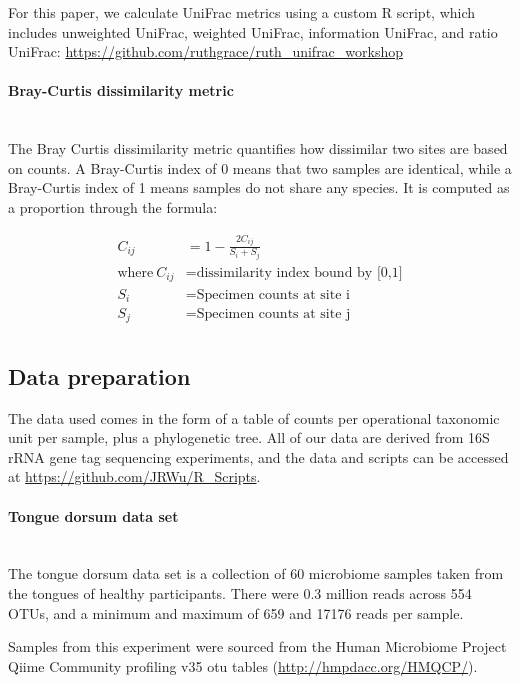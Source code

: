 \documentclass[10pt,letterpaper]{article}
\begin{document}
For this paper, we calculate UniFrac metrics using a custom R script, which includes unweighted UniFrac, weighted UniFrac, information UniFrac, and ratio UniFrac: \url{https://github.com/ruthgrace/ruth_unifrac_workshop}

\paragraph{Bray-Curtis dissimilarity metric}\mbox{}\\
The Bray Curtis dissimilarity metric \cite{beals1984bray} quantifies how dissimilar two sites are based on counts. A Bray-Curtis index of 0 means that two samples are identical, while a Bray-Curtis index of 1 means samples do not share any species. It is computed as a proportion through the formula:

\begin{align*}
C_{ij} &= 1 - \frac{2C_{ij}}{S_{i} + S_{j}} \\
\text{where}~C_{ij}&= \text{dissimilarity index bound by [0,1]} \\
  S_{i} &= \text{Specimen counts at site i} \\
  S_{j} &= \text{Specimen counts at site j} \\
\end{align*}

\subsection{Data preparation}
The data used comes in the form of a table of counts per operational taxonomic unit per sample, plus a phylogenetic tree. All of our data are derived from 16S rRNA gene tag sequencing experiments, and the data and scripts can be accessed at \url{https://github.com/JRWu/R_Scripts}.

\paragraph{Tongue dorsum data set}\mbox{}\\
The tongue dorsum data set is a collection of 60 microbiome samples taken from the tongues of healthy participants. There were 0.3 million reads across 554 OTUs, and a minimum and maximum of 659 and 17176 reads per sample.

Samples from this experiment were sourced from the Human Microbiome Project \cite{turnbaugh2007human} Qiime Community profiling v35 otu tables (\url{http://hmpdacc.org/HMQCP/}).
\end{document}
